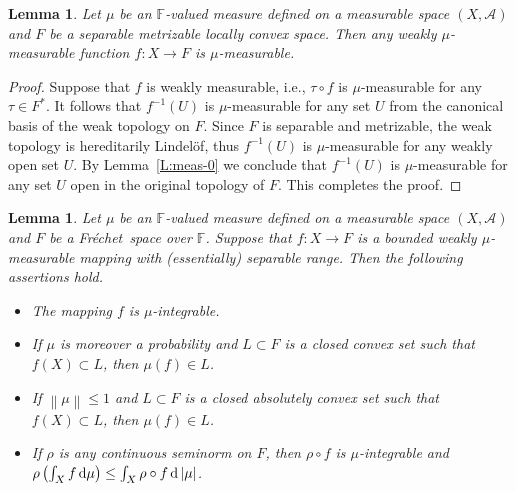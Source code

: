 \documentclass{amsart}
\numberwithin{equation}{section}
\newtheorem{lemma}[thm]{Lemma}
\theoremstyle{definition}
\def\A{\mathcal A}
\def\ef{\mathbb F}
\def\di{\,\mbox{\rm d}}
\newcommand{\norm}[1]{\left\|#1\right\|}
\newcommand{\abs}[1]{\left| #1  \right|}
\newcommand{\fr}{Fr\'echet\ }
\begin{document}
\begin{lemma}
\label{L:meas-ws}
Let $\mu$ be an $\ef$-valued measure defined on a measurable space $(X,\A)$ and $F$ be a separable metrizable locally convex space. Then any weakly $\mu$-measurable function $f:X\to F$ is $\mu$-measurable.
\end{lemma}

\begin{proof} Suppose that $f$ is weakly measurable, i.e., $\tau\circ f$ is $\mu$-measurable for any $\tau\in F^*$.
It follows that $f^{-1}(U)$ is $\mu$-measurable for any set $U$ from the canonical basis of the weak topology on $F$.
Since $F$ is separable and metrizable, the weak topology is hereditarily Lindel\"of, thus $f^{-1}(U)$ is $\mu$-measurable for any weakly open set $U$. By Lemma~\ref{L:meas-0} we conclude that $f^{-1}(U)$ is $\mu$-measurable for any set $U$ open in the original topology of $F$. This completes the proof.
\end{proof}

\begin{lemma}
\label{L:norma}
Let $\mu$ be an $\ef$-valued measure defined on a measurable space $(X,\A)$ and $F$ be a \fr space over $\ef$.
Suppose that $f\colon X\to F$ is a bounded weakly $\mu$-measurable mapping with (essentially) separable range.
Then the following assertions hold.
\begin{itemize}
\item [(a)] The mapping $f$ is  $\mu$-integrable.
\item [(b)] If $\mu$ is moreover a probability and $L\subset F$ is a closed convex set such that $f(X)\subset L$, then $\mu(f)\in L$.
\item [(c)] If $\norm{\mu}\le1$ and $L\subset F$ is a closed absolutely convex set such that $f(X)\subset L$, then $\mu(f)\in L$.

\item [(d)] If $\rho$ is any continuous seminorm on $F$, then $\rho\circ f$ is $\mu$-integrable and $\rho\left(\int_X f\di \mu\right)\le \int_X \rho\circ f\di\abs{\mu}$.
\end{itemize}
\end{lemma}
\end{document}
